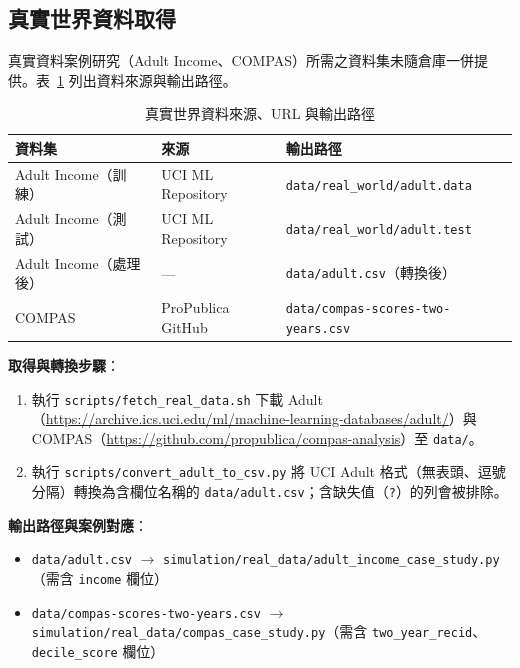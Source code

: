 \documentclass[12pt,a4paper]{article}
\theoremstyle{definition}
\theoremstyle{remark}
\begin{document}
\subsection{真實世界資料取得}
\label{subsec:real_world_data}

真實資料案例研究（Adult Income、COMPAS）所需之資料集未隨倉庫一併提供。表~\ref{tab:real_data_sources_zh} 列出資料來源與輸出路徑。

\begin{table}[htbp]
\centering
\caption{真實世界資料來源、URL 與輸出路徑}
\label{tab:real_data_sources_zh}
\begin{tabular}{lll}
\toprule
\textbf{資料集} & \textbf{來源} & \textbf{輸出路徑} \\
\midrule
Adult Income（訓練） & UCI ML Repository & \texttt{data/real\_world/adult.data} \\
Adult Income（測試） & UCI ML Repository & \texttt{data/real\_world/adult.test} \\
Adult Income（處理後） & --- & \texttt{data/adult.csv}（轉換後） \\
COMPAS & ProPublica GitHub & \texttt{data/compas-scores-two-years.csv} \\
\bottomrule
\end{tabular}
\end{table}

\textbf{取得與轉換步驟}：
\begin{enumerate}
    \item 執行 \texttt{scripts/fetch\_real\_data.sh} 下載 Adult（\url{https://archive.ics.uci.edu/ml/machine-learning-databases/adult/}）與 COMPAS（\url{https://github.com/propublica/compas-analysis}）至 \texttt{data/}。
    \item 執行 \texttt{scripts/convert\_adult\_to\_csv.py} 將 UCI Adult 格式（無表頭、逗號分隔）轉換為含欄位名稱的 \texttt{data/adult.csv}；含缺失值（\texttt{?}）的列會被排除。
\end{enumerate}

\textbf{輸出路徑與案例對應}：
\begin{itemize}
    \item \texttt{data/adult.csv} $\rightarrow$ \texttt{simulation/real\_data/adult\_income\_case\_study.py}（需含 \texttt{income} 欄位）
    \item \texttt{data/compas-scores-two-years.csv} $\rightarrow$ \texttt{simulation/real\_data/compas\_case\_study.py}（需含 \texttt{two\_year\_recid}、\texttt{decile\_score} 欄位）
\end{itemize}
\end{document}
